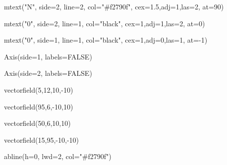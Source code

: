 \documentclass[
  a4paper,
]{scrbook}
\newenvironment{Shaded}{\begin{snugshade}}{\end{snugshade}}
\newcommand{\AttributeTok}[1]{\textcolor[rgb]{0.40,0.45,0.13}{#1}}
\newcommand{\ConstantTok}[1]{\textcolor[rgb]{0.56,0.35,0.01}{#1}}
\newcommand{\DecValTok}[1]{\textcolor[rgb]{0.68,0.00,0.00}{#1}}
\newcommand{\FloatTok}[1]{\textcolor[rgb]{0.68,0.00,0.00}{#1}}
\newcommand{\FunctionTok}[1]{\textcolor[rgb]{0.28,0.35,0.67}{#1}}
\newcommand{\NormalTok}[1]{\textcolor[rgb]{0.00,0.23,0.31}{#1}}
\newcommand{\SpecialCharTok}[1]{\textcolor[rgb]{0.37,0.37,0.37}{#1}}
\newcommand{\StringTok}[1]{\textcolor[rgb]{0.13,0.47,0.30}{#1}}
\theoremstyle{definition}
\theoremstyle{remark}
\begin{document}
\begin{Shaded}
\begin{Highlighting}[]
\FunctionTok{mtext}\NormalTok{(}\StringTok{"N"}\NormalTok{, }\AttributeTok{side=}\DecValTok{2}\NormalTok{, }\AttributeTok{line=}\DecValTok{2}\NormalTok{, }\AttributeTok{col=}\StringTok{"\#f2790f"}\NormalTok{, }\AttributeTok{cex=}\FloatTok{1.5}\NormalTok{,}\AttributeTok{adj=}\DecValTok{1}\NormalTok{,}\AttributeTok{las=}\DecValTok{2}\NormalTok{, }\AttributeTok{at=}\DecValTok{90}\NormalTok{)}

\FunctionTok{mtext}\NormalTok{(}\StringTok{"0"}\NormalTok{, }\AttributeTok{side=}\DecValTok{2}\NormalTok{, }\AttributeTok{line=}\DecValTok{1}\NormalTok{, }\AttributeTok{col=}\StringTok{"black"}\NormalTok{, }\AttributeTok{cex=}\DecValTok{1}\NormalTok{,}\AttributeTok{adj=}\DecValTok{1}\NormalTok{,}\AttributeTok{las=}\DecValTok{2}\NormalTok{, }\AttributeTok{at=}\DecValTok{0}\NormalTok{)}

\FunctionTok{mtext}\NormalTok{(}\StringTok{"0"}\NormalTok{, }\AttributeTok{side=}\DecValTok{1}\NormalTok{, }\AttributeTok{line=}\DecValTok{1}\NormalTok{, }\AttributeTok{col=}\StringTok{"black"}\NormalTok{, }\AttributeTok{cex=}\DecValTok{1}\NormalTok{,}\AttributeTok{adj=}\DecValTok{0}\NormalTok{,}\AttributeTok{las=}\DecValTok{1}\NormalTok{, }\AttributeTok{at=}\SpecialCharTok{{-}}\DecValTok{1}\NormalTok{)}

\FunctionTok{Axis}\NormalTok{(}\AttributeTok{side=}\DecValTok{1}\NormalTok{, }\AttributeTok{labels=}\ConstantTok{FALSE}\NormalTok{)}

\FunctionTok{Axis}\NormalTok{(}\AttributeTok{side=}\DecValTok{2}\NormalTok{, }\AttributeTok{labels=}\ConstantTok{FALSE}\NormalTok{)}

\FunctionTok{vectorfield}\NormalTok{(}\DecValTok{5}\NormalTok{,}\DecValTok{12}\NormalTok{,}\DecValTok{10}\NormalTok{,}\SpecialCharTok{{-}}\DecValTok{10}\NormalTok{)}

\FunctionTok{vectorfield}\NormalTok{(}\DecValTok{95}\NormalTok{,}\DecValTok{6}\NormalTok{,}\SpecialCharTok{{-}}\DecValTok{10}\NormalTok{,}\DecValTok{10}\NormalTok{)}

\FunctionTok{vectorfield}\NormalTok{(}\DecValTok{50}\NormalTok{,}\DecValTok{6}\NormalTok{,}\DecValTok{10}\NormalTok{,}\DecValTok{10}\NormalTok{)}

\FunctionTok{vectorfield}\NormalTok{(}\DecValTok{15}\NormalTok{,}\DecValTok{95}\NormalTok{,}\SpecialCharTok{{-}}\DecValTok{10}\NormalTok{,}\SpecialCharTok{{-}}\DecValTok{10}\NormalTok{)}

 \FunctionTok{abline}\NormalTok{(}\AttributeTok{h=}\DecValTok{0}\NormalTok{, }\AttributeTok{lwd=}\DecValTok{2}\NormalTok{, }\AttributeTok{col=}\StringTok{"\#f2790f"}\NormalTok{)}


\end{Highlighting}
\end{Shaded}
\end{document}
